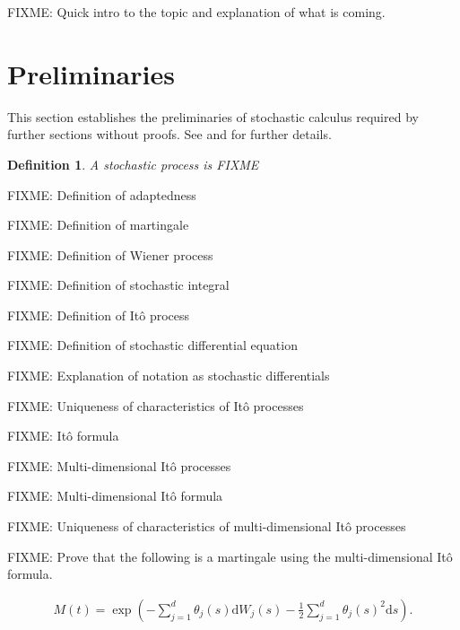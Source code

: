 \documentclass[a4paper]{article}
\newtheorem{definition}{Definition}
\begin{document}
FIXME: Quick intro to the topic and explanation of what is coming.

\section{Preliminaries}


This section establishes the preliminaries of stochastic calculus required by further sections without proofs. See \textcite{capinski_stochastic_2012} and \textcite{capinski_blackscholes_2012} for further details.

\begin{definition}
  A stochastic process is FIXME
\end{definition}

FIXME: Definition of adaptedness

FIXME: Definition of martingale

FIXME: Definition of Wiener process

FIXME: Definition of stochastic integral

FIXME: Definition of It\^o process

FIXME: Definition of stochastic differential equation

FIXME: Explanation of notation as stochastic differentials

FIXME: Uniqueness of characteristics of It\^o processes

FIXME: It\^o formula


FIXME: Multi-dimensional It\^o processes

FIXME: Multi-dimensional It\^o formula

FIXME: Uniqueness of characteristics of multi-dimensional It\^o processes

FIXME: Prove that the following is a martingale using the multi-dimensional It\^o formula.

\begin{align}\label{eq:exp-sums-martingale}
  M(t) = \exp \left( - \sum_{j=1}^{d} \theta_j(s) \mathrm{d}W_j(s) - \frac{1}{2} \sum_{j=1}^{d} \theta_j(s)^2 \mathrm{d}s \right).
\end{align}
\end{document}
